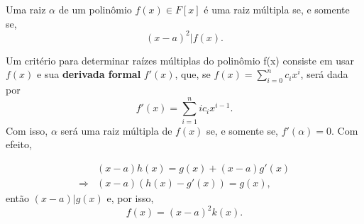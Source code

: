 \documentclass[../algebraIII_notes.tex]{subfiles}
\begin{document}
\begin{tcolorbox}[
		skin=enhanced,
		title=Lembrete!,
		after title={\hfill Raízes Múltiplas},
		fonttitle=\bfseries,
		sharp corners=downhill,
		colframe=black,
		colbacktitle=yellow!75!white,
		colback=yellow!30,
		colbacklower=black,
		coltitle=black,
		drop large lifted shadow
	]
	Uma raiz \(\alpha \) de um polinômio \(f(x)\in F[x]\) é uma \hypertarget{multiple_roots}{raiz múltipla} se, e somente se,
	\[
		(x-a)^{2}| f(x).
	\]

	Um critério para determinar raízes múltiplas do polinômio f(x) consiste em usar \(f(x)\) e sua \textbf{derivada formal} \(f'(x)\), que, se \(f(x) = \sum\limits_{i=0}^{n}c_{i}x^{i}\), será dada por
	\[
		f'(x) = \sum\limits_{i=1}^{n}ic_{i}x^{i-1}.
	\]
	Com isso, \(\alpha \) será uma raiz múltipla de \(f(x)\) se, e somente se, \(f'(\alpha ) = 0.\) Com efeito,

	\begin{align*}
		            & (x-a)h(x) = g(x) + (x-a)g'(x) \\
		\Rightarrow & (x-a)(h(x)-g'(x))=g(x),
	\end{align*}
	então \((x-a) | g(x)\) e, por isso,
	\[
		f(x)=(x-a)^{2}k(x).
	\]
\end{tcolorbox}
\end{document}
